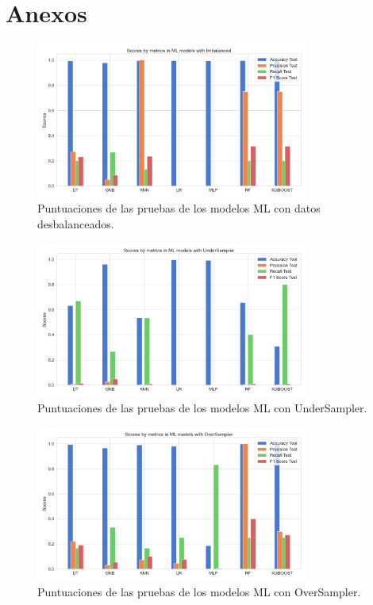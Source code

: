 \chapter*{Anexos}

\begin{figure}[h!]
	\centering
	\includegraphics[width=0.8\textwidth]{"figuras/Experimento2/ML_Imbalanced_test"}
	\caption{Puntuaciones de las pruebas de los modelos ML con datos desbalanceados.}
	\label{an:1}
\end{figure}

\begin{figure}[h!]
	\centering
	\includegraphics[width=0.8\textwidth]{"figuras/Experimento2/ML_UnderSampler_test"}
	\caption{Puntuaciones de las pruebas de los modelos ML con UnderSampler.}
	\label{an:2}
\end{figure}

\begin{figure}[h!]
	\centering
	\includegraphics[width=0.8\textwidth]{"figuras/Experimento2/ML_OverSampler_test"}
	\caption{Puntuaciones de las pruebas de los modelos ML con OverSampler.}
	\label{an:3}
\end{figure}

